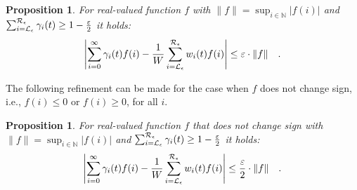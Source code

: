 \documentclass[times, 10pt,twocolumn]{article}
\newtheorem{prop}[theorem]{Proposition}
\begin{document}
	\begin{prop}
		\cite{FoxG_ACM88} For real-valued function $f$ with $\|f\| = \sup_{i \in \mathbb{N}}|f(i)|$ and $\sum_{i=\mathcal{L}_{\epsilon}}^{\mathcal{R}_{\epsilon}} \gamma_{i}(t) \geq 1 - \frac{\varepsilon}{2}$ it holds:
		{\small
		\[
			\left| \sum_{i=0}^{\infty} \gamma_{i}(t) f(i) - \frac{1}{W}\sum_{i = \mathcal{L}_{\epsilon}}^{\mathcal{R}_{\epsilon}} w_{i}(t) f(i) \right| \leq \varepsilon \cdot \|f\| \quad .
		\]
		}
	\end{prop}
	The following refinement can be made for the case when $f$ does not change sign, i.e., $f(i) \leq 0$ or $f(i) \geq 0$, for all $i$.
	\begin{prop}
		For real-valued function $f$ that does not change sign with $\|f\| = \sup_{i \in \mathbb{N}}|f(i)|$ and $\sum_{i=\mathcal{L}_{\epsilon}}^{\mathcal{R}_{\epsilon}} \gamma_{i}(t) \geq 1 - \frac{\varepsilon}{2}$ it holds:
		{\small
		\[
			\left| \sum_{i=0}^{\infty} \gamma_{i}(t) f(i) - \frac{1}{W}\sum_{i = \mathcal{L}_{\epsilon}}^{\mathcal{R}_{\epsilon}} w_{i}(t) f(i) \right| \leq \frac{\varepsilon}{2} \cdot \|f\| \quad .
		\]
		}
		\label{pr:fg_imp}
	\end{prop}
\end{document}
